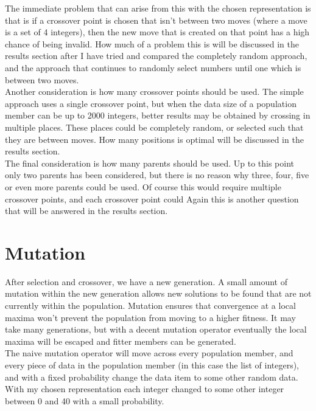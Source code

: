 \documentclass[]{report}
\begin{document}
The immediate problem that can arise from this with the chosen representation is that is if a crossover point is chosen that isn't between two moves (where a move is a set of 4 integers), then the new move that is created on that point has a high chance of being invalid. How much of a problem this is will be discussed in the results section after I have tried and compared the completely random approach, and the approach that continues to randomly select numbers until one which is between two moves. \\

Another consideration is how many crossover points should be used. The simple approach uses a single crossover point, but when the data size of a population member can be up to 2000 integers, better results may be obtained by crossing in multiple places. These places could be completely random, or selected such that they are between moves. How many positions is optimal will be discussed in the results section. \\

The final consideration is how many parents should be used. Up to this point only two parents has been considered, but there is no reason why three, four, five or even more parents could be used. Of course this would require multiple crossover points, and each crossover point could  Again this is another question that will be answered in the results section.

\section{Mutation}

After selection and crossover, we have a new generation. A small amount of mutation within the new generation allows new solutions to be found that are not currently within the population. Mutation ensures that convergence at a local maxima won't prevent the population from moving to a higher fitness. It may take many generations, but with a decent mutation operator eventually the local maxima will be escaped and fitter members can be generated.\\

The naive mutation operator will move across every population member, and every piece of data in the population member (in this case the list of integers), and with a fixed probability change the data item to some other random data. With my chosen representation each integer changed to some other integer between 0 and 40 with a small probability.\\
\end{document}
